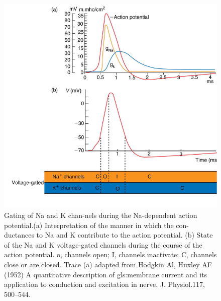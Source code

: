\documentclass[class={myRUCProject}, crop=false]{standalone}
\begin{document}
 \begin{figure}[H]
   \centering
   \includegraphics[width=0.5\linewidth]{Pictures//Anakin/N.K.png}
   \caption{Gating of \gls{Na} and \gls{K} chan-nels during the \gls{Na}-dependent action potential.(a) Interpretation of the manner in which the con-ductances to \gls{Na} and \gls{K} contribute to the action potential. (b) State of the \gls{Na} and \gls{K} voltage-gated channels during the course of the action potential. o, channels open; I, channels inactivate; C, channels close or are closed. Trace (a) adapted from Hodgkin Al, Huxley AF (1952) A quantitative description of \gls{gls:membrane} current and its application to conduction and excitation in nerve. J. Physiol.117, 500–544.}
   \label{fig:Knumber}
 \end{figure}
 
\end{document}
